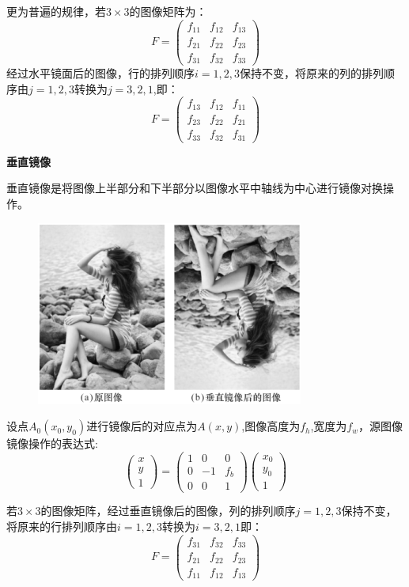\documentclass[11pt]{article}
\begin{document}
更为普遍的规律，若$3\times 3$的图像矩阵为：
$$F = \begin{pmatrix}f_{11} & f_{12} & f_{13}\\f_{21} & f_{22} & f_{23} \\f_{31} & f_{32} & f_{33} \end{pmatrix}$$
经过水平镜面后的图像，行的排列顺序$i = 1,2,3$保持不变，将原来的列的排列顺序由$j=1,2,3$转换为$j=3,2,1$,即：
$$F = \begin{pmatrix}f_{13} & f_{12} & f_{11}\\f_{23} & f_{22} & f_{21} \\f_{33} & f_{32} & f_{31} \end{pmatrix}$$

\textbf{垂直镜像}

垂直镜像是将图像上半部分和下半部分以图像水平中轴线为中心进行镜像对换操作。
\begin{figure}
	\centering
	\includegraphics[width=0.23\textheight]{15}
\end{figure}

设点$A_0(x_0,y_0)$进行镜像后的对应点为$A(x,y)$,图像高度为$f_h$,宽度为$f_w$，源图像镜像操作的表达式:
$$\begin{pmatrix}x \\y \\1 \end{pmatrix}=\begin{pmatrix}1 & 0 & 0 \\ 0 & -1 & f_b\\ 0 & 0 & 1\end{pmatrix}\begin{pmatrix}x_0 \\ y_0 \\ 1\end{pmatrix}$$

若$3\times 3$的图像矩阵，经过垂直镜像后的图像，列的排列顺序$j=1,2,3$保持不变，将原来的行排列顺序由$i = 1,2,3$转换为$i = 3,2,1$即：
$$F = \begin{pmatrix}f_{31} & f_{32} & f_{33}\\f_{21} & f_{22} & f_{23} \\f_{11} & f_{12} & f_{13} \end{pmatrix}$$
\end{document}
